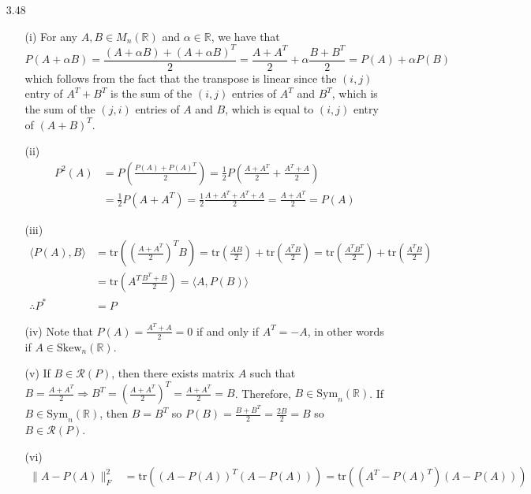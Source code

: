 \documentclass[letterpaper,12pt]{article}
\theoremstyle{definition}
\begin{document}
\begin{enumerate}
        \item[3.48]
          \begin{enumerate}
            \item[(i)]
            For any $A, B \in M_n(\mathbb{R})$ and $\alpha \in \mathbb{R}$, we have that
              \begin{equation*}
                P(A+\alpha B) = \frac{(A+\alpha B)+(A+\alpha B)^T}{2} = \frac{A+A^T}{2} + \alpha\frac{B+ B^T}{2} = P(A) + \alpha P(B)
              \end{equation*}
            which follows from the fact that the transpose is linear since the $(i,j)$ entry of $A^T + B^T$ is the sum of the $(i,j)$ entries of $A^T$ and $B^T$, which is the sum of the $(j,i)$ entries of $A$ and $B$, which is equal to $(i,j)$ entry of $(A+B)^T$.
            \item[(ii)]
            \begin{align*}
              P^2(A) &= P(\frac{P(A)+P(A)^T}{2}) = \frac{1}{2}P(\frac{A+A^T}{2}+\frac{A^T+A}{2}) \\
              &= \frac{1}{2}P(A+A^T) = \frac{1}{2}\frac{A+A^T + A^T+A}{2} = \frac{A+A^T}{2} = P(A)
            \end{align*}
            \item[(iii)]
            \begin{align*}
              \langle P(A), B \rangle &= \text{tr}((\frac{A+A^T}{2})^TB) = \text{tr}(\frac{AB}{2}) + \text{tr}(\frac{A^TB}{2}) = \text{tr}(\frac{A^TB^T}{2}) + \text{tr}(\frac{A^TB}{2}) \\
              &= \text{tr}(A^T\frac{B^T+B}{2}) = \langle A, P(B) \rangle \\
              \therefore P^* &= P
            \end{align*}
            \item[(iv)]
              Note that $P(A) = \frac{A^T+A}{2} = 0$ if and only if $A^T = -A$, in other words if $A \in \text{Skew}_n(\mathbb{R})$.
            \item[(v)]
              If $B \in \mathscr{R}(P)$, then there exists matrix $A$ such that $B = \frac{A + A^T}{2} \Longrightarrow B^T = (\frac{A + A^T}{2})^T = \frac{A + A^T}{2} = B$. Therefore, $B \in \text{Sym}_n(\mathbb{R})$.
              If $B \in \text{Sym}_n(\mathbb{R})$, then $B = B^T$ so $P(B) = \frac{B + B^T}{2} = \frac{2B}{2} = B$ so $B \in \mathscr{R}(P)$.
            \item[(vi)]
              \begin{align*}
                \|A-P(A)\|_F^2 &= \text{tr}((A-P(A))^T(A-P(A))) = \text{tr}((A^T-P(A)^T)(A-P(A))) \\

\end{align*}
\end{enumerate}
\end{enumerate}
\end{document}
